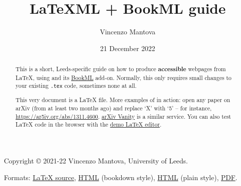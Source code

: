 \documentclass[a4paper]{article}
\title{LaTeXML + BookML guide}
\author{Vincenzo Mantova}
\date{21 December 2022}
\theoremstyle{definition}
\begin{document}
\begin{lxFooter}
  Copyright \copyright{} 2021-22 Vincenzo Mantova, University of Leeds.
\end{lxFooter}
\fancyfoot[C]{}
\fancyfoot[R]{\thepage}
\pagestyle{fancy}


\maketitle

\begin{abstract}
  This is a short, Leeds-specific guide on how to produce \textbf{accessible} webpages from \LaTeX{}, using \LaTeXML{} and its \href{https://vlmantova.github.io/bookml/}{BookML} add-on. Normally, this only requires small changes to your existing \verb|.tex| code, sometimes none at all.

  This very document is a \LaTeX{} file. More examples of \LaTeXML{} in action: open any paper on arXiv (from at least two months ago) and replace `X' with `5' -- for instance, \url{https://ar5iv.org/abs/1311.4600}. \href{https://www.arxiv-vanity.com/}{arXiv Vanity} is a similar service. You can also test \LaTeX{} code in the browser with the \href{https://latexml.mathweb.org/editor}{demo \LaTeX{} editor}.
\end{abstract}

\begin{center}
  Formats: \href{https://dev.azure.com/pmtvlm-leeds-ac-uk/public/_git/latexmlleeds}{\LaTeX{} source}, \href{https://minerva.leeds.ac.uk/bbcswebdav/courses/201920_MAPS_MM8863/latexmlleeds/index.html}{HTML} (bookdown style), \href{https://minerva.leeds.ac.uk/bbcswebdav/courses/201920_MAPS_MM8863/latexmlleeds/index.plain.html}{HTML} (plain style), \href{https://minerva.leeds.ac.uk/bbcswebdav/courses/201920_MAPS_MM8863/latexmlleeds/LaTeXML-Leeds.pdf}{PDF}.
\end{center}
\end{document}
